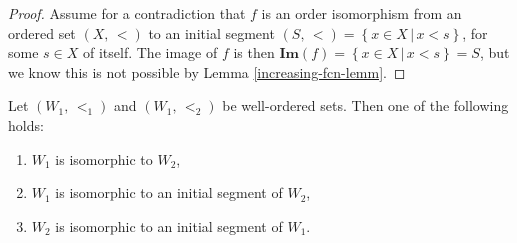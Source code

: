 \documentclass[../../main.tex]{subfiles}
\begin{document}
\begin{proof}\cite[Lemma 2.2, p.13]{Jec78}
    Assume for a contradiction that $f$ is an order isomorphism from an ordered set $\left(X,\, <\right)$ to an initial segment $\left(S,\, <\right) = \left\{x \in X \,\vert\, x < s\right\}$, for some $s \in X$ of itself.
    The image of $f$ is then $\mathbf{Im}\left(f\right) = \left\{x \in X \,\vert\, x < s\right\} = S$, but we know this is not possible by Lemma \ref{increasing-fcn-lemm}. 
\end{proof}

\begin{theorem}\label{well-order-isomorphism}\cite[Theorem 1]{Jec78}
    Let $(W_1,\, <_1)$ and $(W_1,\, <_2)$ be well-ordered sets.
    Then one of the following holds:
    \begin{enumerate}
        \item $W_1$ is isomorphic to $W_2$,
        \item $W_1$ is isomorphic to an initial segment of $W_2$,
        \item $W_2$ is isomorphic to an initial segment of $W_1$.
    \end{enumerate}
\end{theorem}
\end{document}
